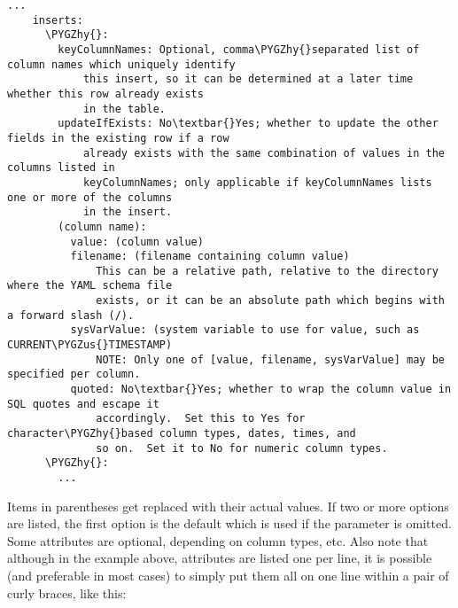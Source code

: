\documentclass[letterpaper,10pt,english]{sphinxmanual}
\def\PYGZus{\char`\_}
\def\PYGZhy{\char`\-}
\begin{document}
\begin{Verbatim}[commandchars=\\\{\}]
      ...
    inserts:
      \PYGZhy{}:
        keyColumnNames: Optional, comma\PYGZhy{}separated list of column names which uniquely identify
            this insert, so it can be determined at a later time whether this row already exists
            in the table.
        updateIfExists: No\textbar{}Yes; whether to update the other fields in the existing row if a row
            already exists with the same combination of values in the columns listed in
            keyColumnNames; only applicable if keyColumnNames lists one or more of the columns
            in the insert.
        (column name):
          value: (column value)
          filename: (filename containing column value)
              This can be a relative path, relative to the directory where the YAML schema file
              exists, or it can be an absolute path which begins with a forward slash (/).
          sysVarValue: (system variable to use for value, such as CURRENT\PYGZus{}TIMESTAMP)
              NOTE: Only one of [value, filename, sysVarValue] may be specified per column.
          quoted: No\textbar{}Yes; whether to wrap the column value in SQL quotes and escape it
              accordingly.  Set this to Yes for character\PYGZhy{}based column types, dates, times, and
              so on.  Set it to No for numeric column types.
      \PYGZhy{}:
        ...
\end{Verbatim}

Items in parentheses get replaced with their actual values.  If two or more options are listed, the
first option is the default which is used if the parameter is omitted.  Some attributes are
optional, depending on column types, etc.  Also note that although in the example above, attributes
are listed one per line, it is possible (and preferable in most cases) to simply put them all on one
line within a pair of curly braces, like this:
\end{document}
